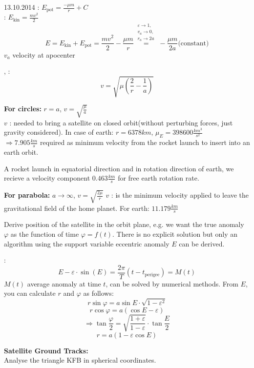 \begin{chapter}{13.10.2014}
 : $E_\text{pot} = \frac{-\mu m}{r} +C$\\
 : $E_\text{kin} = \frac{m v^2}{2}$
 \[ E = E_\text{kin} + E_\text{pot} = \frac{mv^2}{2} - \frac{\mu m}{r} \stackrel{\substack{\varepsilon \rightarrow 1\text{, }\\v_a \rightarrow 0\text{, }\\r_a \rightarrow 2a}}{=} -\frac{\mu m}{2a} \text{(constant)}\]
 $v_a$ velocity at apocenter
 
 , :
 \[ v = \sqrt{\mu \left( \frac{2}{r} - \frac{1}{a} \right)} \]

 \textbf{For circles:} $r=a$, $v=\sqrt{\frac{\mu}{a}}$\\
 $v$ : needed to bring a satellite on closed orbit(without perturbing forces, just gravity considered). In case of earth: $r = 6378km$, $\mu_E = 398600 \frac{km^3}{s^2}$\\
 $\Rightarrow 7.905 \frac{km}{s}$ required as minimum velocity from the rocket launch to insert into an earth orbit.
 
 A rocket launch in equatorial direction and in rotation direction of earth, we recieve a velocity component $0.463 \frac{km}{s}$ for free earth rotation rate.
 
 \textbf{For parabola:} $a\rightarrow \infty$, $v = \sqrt{\frac{2\mu}{r}}$
 $v$ : is the minimum velocity applied to leave the gravitational field of the home planet. For earth: $11.179 \frac{km}{s}$

 Derive position of the satellite in the orbit plane, e.g. we want the true anomaly $\varphi$ as the function of time $\varphi = f(t)$. There is no explicit solution but only an algorithm using the support variable eccentric anomaly $E$ can be derived.
 
 \textbf{}:
 \[ E - \varepsilon\cdot\sin(E) = \frac{2\pi}{T}(t-t_\text{perigee}) =M(t) \]
 $M(t)$ average anomaly at time $t$, can be solved by numerical methods. From $E$, you can calculate $r$ and $\varphi$ as follows:\\
 \[r\sin\varphi = a\sin E \cdot \sqrt{1-\varepsilon^2}\]
 \[r\cos\varphi = a(\cos E - \varepsilon)\]
 \[\Rightarrow \tan \frac{\varphi}{2} = \sqrt{\frac{1+\varepsilon}{1-\varepsilon}}\cdot \tan\frac{E}{2}\]
 \[r=a(1-\varepsilon\cos E)\]
 
 \textbf{Satellite Ground Tracks:}\\
 Analyse the triangle KFB in spherical coordinates.
 

\end{chapter}
